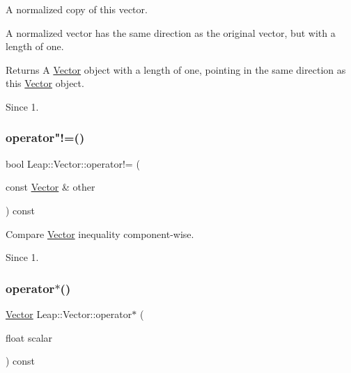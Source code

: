 A normalized copy of this vector.

A normalized vector has the same direction as the original vector, but with a length of one.


\begin{DoxyCodeInclude}
\end{DoxyCodeInclude}


\begin{DoxyReturn}{Returns}
A \hyperlink{struct_leap_1_1_vector}{Vector} object with a length of one, pointing in the same direction as this \hyperlink{struct_leap_1_1_vector}{Vector} object. 
\end{DoxyReturn}
\begin{DoxySince}{Since}
1. 
\end{DoxySince}
\mbox{\label{struct_leap_1_1_vector_a749e4340ca64ff3549f4d84eb398ac4f}} 
\subsubsection{\texorpdfstring{operator"!=()}{operator!=()}}
{\footnotesize\ttfamily bool Leap\+::\+Vector\+::operator!= (\begin{DoxyParamCaption}\item[{const \hyperlink{struct_leap_1_1_vector}{Vector} \&}]{other }\end{DoxyParamCaption}) const\hspace{0.3cm}{\ttfamily [inline]}}

Compare \hyperlink{struct_leap_1_1_vector}{Vector} inequality component-\/wise.


\begin{DoxyCodeInclude}
\end{DoxyCodeInclude}
 \begin{DoxySince}{Since}
1. 
\end{DoxySince}
\mbox{\label{struct_leap_1_1_vector_a3d9fcce0dd22cfe643c18bb97d16b613}} 
\subsubsection{\texorpdfstring{operator$\ast$()}{operator*()}}
{\footnotesize\ttfamily \hyperlink{struct_leap_1_1_vector}{Vector} Leap\+::\+Vector\+::operator$\ast$ (\begin{DoxyParamCaption}\item[{float}]{scalar }\end{DoxyParamCaption}) const\hspace{0.3cm}{\ttfamily [inline]}}

